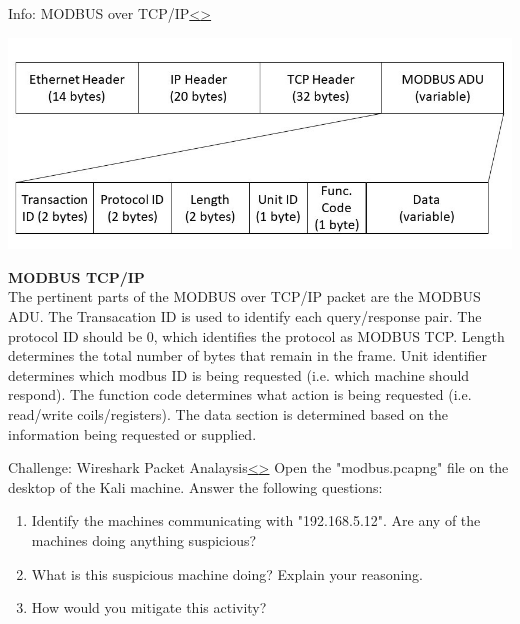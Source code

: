 \documentclass[12pt]{extarticle}
\newenvironment{instructionblock}{\Large\bgroup}{\egroup}
\newcommand{\ben}{\begin{enumerate}}
\newcommand{\een}{\end{enumerate}}
\newcounter{next}
\newcounter{prev}
\begin{document}
\begin{slide}{Info: MODBUS over TCP/IP}{\hyperref[slide \theprev]{\textless}\hyperref[slide \thenext]{\textgreater}}
\begin{instructionblock}
\begin{center}
	\includegraphics[scale=0.68]{figures/MODBUS1.JPG}
\end{center}
\end{instructionblock}
\end{slide}
\vfill
\noindent
\textbf{MODBUS TCP/IP}\\
The pertinent parts of the MODBUS over TCP/IP packet are the MODBUS ADU. The Transacation ID is used to identify each query/response pair. The protocol ID should be 0, which identifies the protocol as MODBUS TCP. Length determines the total number of bytes that remain in the frame. Unit identifier determines which modbus ID is being requested (i.e. which machine should respond). The function code determines what action is being requested (i.e. read/write coils/registers). The data section is determined based on the information being requested or supplied. \cite[p.124-127]{KnappLangill}

\pagebreak
{}
\begin{slide}{Challenge: Wireshark Packet Analaysis}{\hyperref[slide \theprev]{\textless}\hyperref[slide \thenext]{\textgreater}}
\begin{instructionblock}
Open the "modbus.pcapng" file on the desktop of the Kali machine. Answer the following questions:
	\ben
	\item Identify the machines communicating with "192.168.5.12". Are any of the machines doing anything suspicious?
	\item What is this suspicious machine doing? Explain your reasoning.
	\item How would you mitigate this activity?
	\een
\end{instructionblock}
\end{slide}
\end{document}
